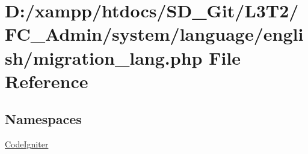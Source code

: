 \hypertarget{_admin_2system_2language_2english_2migration__lang_8php}{}\section{D\+:/xampp/htdocs/\+S\+D\+\_\+\+Git/\+L3\+T2/\+F\+C\+\_\+\+Admin/system/language/english/migration\+\_\+lang.php File Reference}
\label{_admin_2system_2language_2english_2migration__lang_8php}
\subsection*{Namespaces}
\begin{DoxyCompactItemize}
\item 
 \hyperlink{namespace_code_igniter}{Code\+Igniter}
\end{DoxyCompactItemize}
